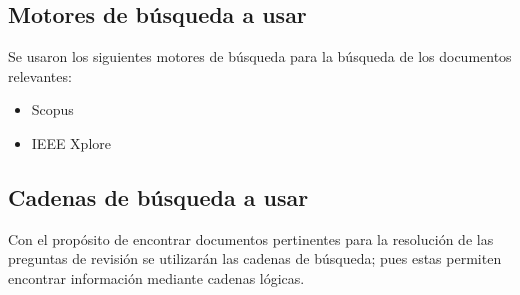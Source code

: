 \subsection{Motores de búsqueda a usar}

Se usaron los siguientes motores de búsqueda para la búsqueda de los documentos relevantes:

\begin{itemize}
    \item Scopus
    \item IEEE Xplore
\end{itemize}

\subsection{Cadenas de búsqueda a usar}

Con el propósito de encontrar documentos pertinentes para la resolución de las preguntas de revisión se utilizarán las cadenas de búsqueda; pues estas permiten encontrar información mediante cadenas lógicas.

